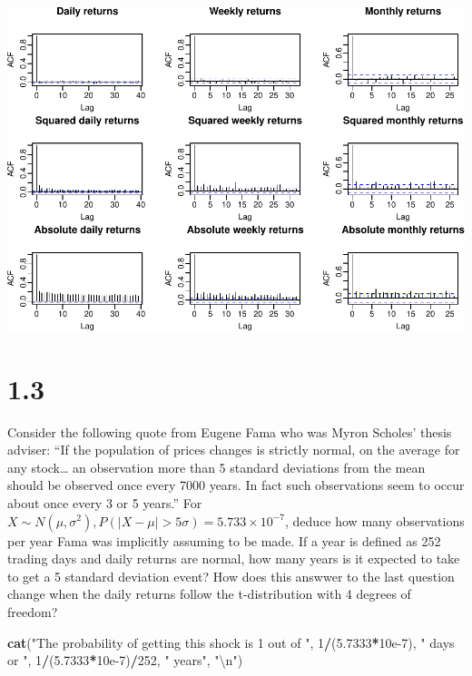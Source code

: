 \documentclass[11pt,]{article}
\newenvironment{Shaded}{\begin{snugshade}}{\end{snugshade}}
\newcommand{\CharTok}[1]{\textcolor[rgb]{0.31,0.60,0.02}{#1}}
\newcommand{\DecValTok}[1]{\textcolor[rgb]{0.00,0.00,0.81}{#1}}
\newcommand{\FloatTok}[1]{\textcolor[rgb]{0.00,0.00,0.81}{#1}}
\newcommand{\KeywordTok}[1]{\textcolor[rgb]{0.13,0.29,0.53}{\textbf{#1}}}
\newcommand{\NormalTok}[1]{#1}
\newcommand{\OperatorTok}[1]{\textcolor[rgb]{0.81,0.36,0.00}{\textbf{#1}}}
\newcommand{\StringTok}[1]{\textcolor[rgb]{0.31,0.60,0.02}{#1}}
\begin{document}
\includegraphics{hw1_files/figure-latex/unnamed-chunk-8-1.pdf}

\hypertarget{section-1}{%
\section{1.3}\label{section-1}}

Consider the following quote from Eugene Fama who was Myron Scholes'
thesis adviser: ``If the population of prices changes is strictly
normal, on the average for any stock\ldots{} an observation more than 5
standard deviations from the mean should be observed once every 7000
years. In fact such observations seem to occur about once every 3 or 5
years.'' For
\(X \sim N(\mu, \sigma^2), P(|X-\mu| > 5\sigma) = 5.733 \times 10^{-7}\),
deduce how many observations per year Fama was implicitly assuming to be
made. If a year is defined as 252 trading days and daily returns are
normal, how many years is it expected to take to get a 5 standard
deviation event? How does this answwer to the last question change when
the daily returns follow the t-distribution with 4 degrees of freedom?

\begin{Shaded}
\begin{Highlighting}[]
\KeywordTok{cat}\NormalTok{(}\StringTok{"The probability of getting this shock is 1 out of "}\NormalTok{, }
    \DecValTok{1}\OperatorTok{/}\NormalTok{(}\FloatTok{5.7333}\OperatorTok{*}\FloatTok{10e-7}\NormalTok{), }\StringTok{" days or "}\NormalTok{, }\DecValTok{1}\OperatorTok{/}\NormalTok{(}\FloatTok{5.7333}\OperatorTok{*}\FloatTok{10e-7}\NormalTok{)}\OperatorTok{/}\DecValTok{252}\NormalTok{, }\StringTok{" years"}\NormalTok{, }\StringTok{"}\CharTok{\textbackslash{}n}\StringTok{"}\NormalTok{)}
\end{Highlighting}
\end{Shaded}
\end{document}
